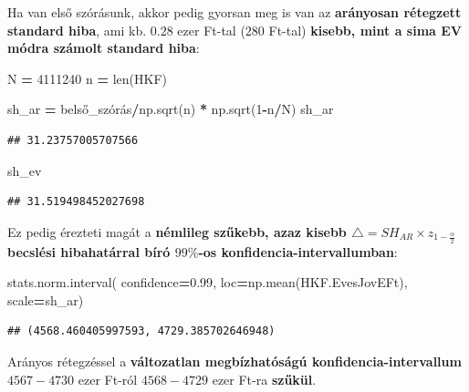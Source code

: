 \documentclass[
]{book}
\newenvironment{Shaded}{\begin{snugshade}}{\end{snugshade}}
\newcommand{\BuiltInTok}[1]{#1}
\newcommand{\DecValTok}[1]{\textcolor[rgb]{0.00,0.00,0.81}{#1}}
\newcommand{\FloatTok}[1]{\textcolor[rgb]{0.00,0.00,0.81}{#1}}
\newcommand{\NormalTok}[1]{#1}
\newcommand{\OperatorTok}[1]{\textcolor[rgb]{0.81,0.36,0.00}{\textbf{#1}}}
\begin{document}
Ha van első szórásunk, akkor pedig gyorsan meg is van az \textbf{arányosan rétegzett standard hiba}, ami kb. \(0.28\) ezer Ft-tal (\(280\) Ft-tal) \textbf{kisebb, mint a sima EV módra számolt standard hiba}:

\begin{Shaded}
\begin{Highlighting}[]
\NormalTok{N }\OperatorTok{=} \DecValTok{4111240}
\NormalTok{n }\OperatorTok{=} \BuiltInTok{len}\NormalTok{(HKF)}

\NormalTok{sh\_ar }\OperatorTok{=}\NormalTok{ belső\_szórás}\OperatorTok{/}\NormalTok{np.sqrt(n) }\OperatorTok{*}\NormalTok{ np.sqrt(}\DecValTok{1}\OperatorTok{{-}}\NormalTok{n}\OperatorTok{/}\NormalTok{N)}
\NormalTok{sh\_ar}
\end{Highlighting}
\end{Shaded}

\begin{verbatim}
## 31.23757005707566
\end{verbatim}

\begin{Shaded}
\begin{Highlighting}[]
\NormalTok{sh\_ev}
\end{Highlighting}
\end{Shaded}

\begin{verbatim}
## 31.519498452027698
\end{verbatim}

Ez pedig érezteti magát a \textbf{némlileg szűkebb, azaz kisebb \(\triangle=SH_{AR} \times z_{1-\frac{\alpha}{2}}\) becslési hibahatárral bíró \(99\%\)-os konfidencia-intervallumban}:

\begin{Shaded}
\begin{Highlighting}[]
\NormalTok{stats.norm.interval(}
\NormalTok{  confidence}\OperatorTok{=}\FloatTok{0.99}\NormalTok{,}
\NormalTok{  loc}\OperatorTok{=}\NormalTok{np.mean(HKF.EvesJovEFt),}
\NormalTok{  scale}\OperatorTok{=}\NormalTok{sh\_ar)}
\end{Highlighting}
\end{Shaded}

\begin{verbatim}
## (4568.460405997593, 4729.385702646948)
\end{verbatim}

Arányos rétegzéssel a \textbf{változatlan megbízhatóságú konfidencia-intervallum} \(4567 - 4730\) ezer Ft-ról \(4568 - 4729\) ezer Ft-ra \textbf{szűkül}.
\end{document}
